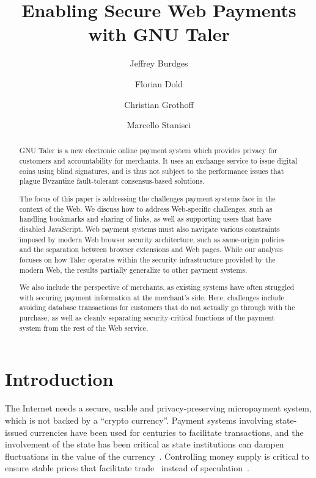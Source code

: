 \documentclass{llncs}
\date{}
\begin{document}
\title{Enabling Secure Web Payments with GNU Taler}


\author{Jeffrey Burdges \and
Florian Dold \and
Christian Grothoff \and
Marcello Stanisci}

\maketitle




\begin{abstract}
GNU Taler is a new electronic online payment system which provides
privacy for customers and accountability for merchants. It uses an
exchange service to issue digital coins using blind signatures,
and is thus not subject to the performance issues that plague
Byzantine fault-tolerant consensus-based solutions.

The focus of this paper is addressing the challenges payment systems
face in the context of the Web.  We discuss how to address
Web-specific challenges, such as handling bookmarks and sharing of
links, as well as supporting users that have disabled JavaScript.  Web
payment systems must also navigate various constraints imposed by
modern Web browser security architecture, such as same-origin policies
and the separation between browser extensions and Web pages.  While
our analysis focuses on how Taler operates within the security
infrastructure provided by the modern Web, the results partially
generalize to other payment systems.

We also include the perspective of merchants, as existing systems have
often struggled with securing payment information at the merchant's
side.  Here, challenges include avoiding database transactions for
customers that do not actually go through with the purchase, as well
as cleanly separating security-critical functions of the payment
system from the rest of the Web service.
\end{abstract}

\section{Introduction}

The Internet needs a secure, usable and privacy-preserving
micropayment system, which is not backed by a ``crypto currency''.
Payment systems involving state-issued currencies have been used for
centuries to facilitate transactions, and the involvement of the state
has been critical as state institutions can dampen fluctuations in the
value of the currency~\cite{dominguez1993}. Controlling money supply
is critical to ensure stable prices that facilitate
trade~\cite{quantitytheory1997volckart} instead of speculation~\cite{lewis_btc_is_junk}.
\end{document}
